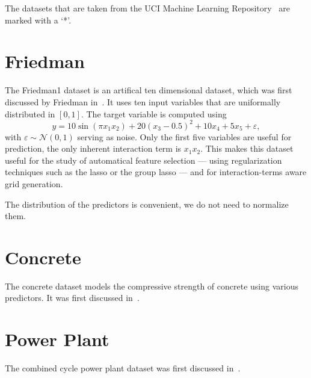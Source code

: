 The datasets that are taken from the UCI Machine Learning Repository~\cite{datasets-uci} are marked
with a `*'.

\section{Friedman}\label{sec:friedman}
The Friedman1 dataset is an artifical ten dimensional dataset, which was first
discussed by Friedman in~\cite{datasets-friedman}.
It uses ten input variables that are uniformally distributed in \([0,1]\).
The target variable is computed using
\begin{equation*}
 y = 10 \sin(\pi x_1 x_2) + 20(x_3 - 0.5)^2 + 10x_4 + 5x_5 + \varepsilon,
\end{equation*}
with \(\varepsilon \sim \mathcal{N}(0,1)\) serving as noise.
Only the first five variables are useful for prediction, the only inherent
interaction term is \(x_1 x_2\).
This makes this dataset useful for the study of automatical feature selection
--- using regularization techniques such as the lasso or the group lasso ---
and for interaction-terms aware grid generation.

The distribution of the predictors is convenient, we do not need to normalize
them.

\section{Concrete}
The concrete dataset models the compressive strength of concrete using various
predictors.
It was first discussed in~\cite{datasets-concrete}.

\section{Power Plant}
The combined cycle power plant dataset was first discussed in~\cite{datasets-powerplant}.
